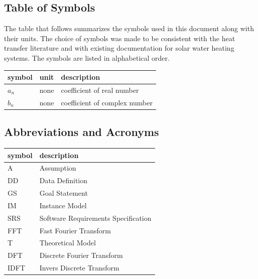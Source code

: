 \documentclass[12pt]{article}
\newcommand{\famname}{FFT} %
\begin{document}

\subsection{Table of Symbols}

The table that follows summarizes the symbols used in this document along with
their units.  The choice of symbols was made to be consistent with the heat
transfer literature and with existing documentation for solar water heating
systems.  The symbols are listed in alphabetical order.

\renewcommand{\arraystretch}{1.2}
\noindent \begin{longtable*}{l l p{12cm}} \toprule
\textbf{symbol} & \textbf{unit} & \textbf{description}\\
\midrule 
$a_n$ & none & coefficient of real number
\\
$b_n$ &none &coefficient of complex number
\\ 
\bottomrule
\end{longtable*}


\subsection{Abbreviations and Acronyms}

\renewcommand{\arraystretch}{1.2}
\begin{tabular}{l l} 
  \toprule		
  \textbf{symbol} & \textbf{description}\\
  \midrule 
  A & Assumption\\
  DD & Data Definition\\
  GS & Goal Statement\\
  IM & Instance Model\\
  SRS & Software Requirements Specification\\
  \famname{} & Fast Fourier Transform\\
  T & Theoretical Model\\
  DFT & Discrete Fourier Transform\\
  IDFT & Invers Discrete Transform\\
  \bottomrule
\end{tabular}\\
\end{document}
